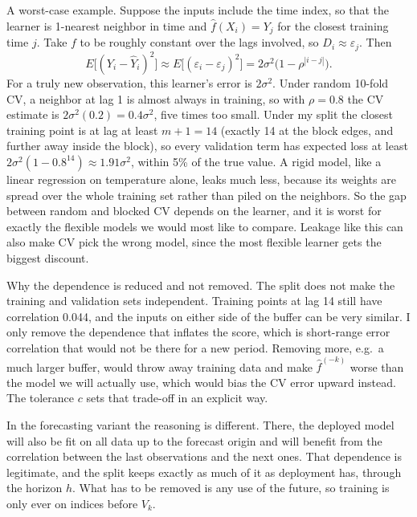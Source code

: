 \documentclass[12pt,letterpaper, onecolumn]{exam}
\begin{document}
\begin{questions}
\begin{solution}
\begin{enumerate}[(a)]
            A worst-case example. Suppose the inputs include the time index, so that the learner is 1-nearest neighbor in time and $\hat f(X_i) = Y_j$ for the closest training time $j$. Take $f$ to be roughly constant over the lags involved, so $D_i \approx \varepsilon_j$. Then
            \begin{equation*}
                E\bigl[(Y_i-\hat Y_i)^2\bigr] \approx E\bigl[(\varepsilon_i-\varepsilon_j)^2\bigr] = 2\sigma^2\bigl(1-\rho^{|i-j|}\bigr).
            \end{equation*}
            For a truly new observation, this learner's error is $2\sigma^2$. Under random 10-fold CV, a neighbor at lag 1 is almost always in training, so with $\rho = 0.8$ the CV estimate is $2\sigma^2(0.2) = 0.4\sigma^2$, five times too small. Under my split the closest training point is at lag at least $m+1 = 14$ (exactly 14 at the block edges, and further away inside the block), so every validation term has expected loss at least $2\sigma^2(1-0.8^{14}) \approx 1.91\sigma^2$, within 5\% of the true value. A rigid model, like a linear regression on temperature alone, leaks much less, because its weights are spread over the whole training set rather than piled on the neighbors. So the gap between random and blocked CV depends on the learner, and it is worst for exactly the flexible models we would most like to compare. Leakage like this can also make CV pick the wrong model, since the most flexible learner gets the biggest discount.

            Why the dependence is reduced and not removed. The split does not make the training and validation sets independent. Training points at lag 14 still have correlation 0.044, and the inputs on either side of the buffer can be very similar. I only remove the dependence that inflates the score, which is short-range error correlation that would not be there for a new period. Removing more, e.g.\ a much larger buffer, would throw away training data and make $\hat f^{(-k)}$ worse than the model we will actually use, which would bias the CV error upward instead. The tolerance $c$ sets that trade-off in an explicit way.

            In the forecasting variant the reasoning is different. There, the deployed model will also be fit on all data up to the forecast origin and will benefit from the correlation between the last observations and the next ones. That dependence is legitimate, and the split keeps exactly as much of it as deployment has, through the horizon $h$. What has to be removed is any use of the future, so training is only ever on indices before $V_k$.


\end{enumerate}
\end{solution}
\end{questions}
\end{document}
